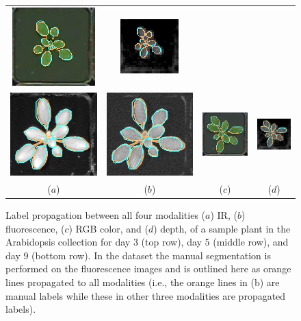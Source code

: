 \begin{figure}[t]
\begin{centering}
\begin{tabular}{cccc}
\includegraphics[width=.15\textwidth]{Figures/LabelAlignment/day_5_hour_23-seg_rgb.png}&
\includegraphics[width=.15\textwidth]{Figures/LabelAlignment/day_5_hour_23-seg_depth.png}\\
\includegraphics[width=.15\textwidth]{Figures/LabelAlignment/day_9_hour_20-seg_ir.png}&
\includegraphics[width=.15\textwidth]{Figures/LabelAlignment/day_9_hour_20-seg_fmp.png}&
\includegraphics[width=.15\textwidth]{Figures/LabelAlignment/day_9_hour_20-seg_rgb.png}&
\includegraphics[width=.15\textwidth]{Figures/LabelAlignment/day_9_hour_20-seg_depth.png}\\
($a$) & ($b$) & ($c$) & ($d$) \\
\end{tabular}
\caption{Label propagation between all four modalities ($a$) IR, ($b$) fluorescence, ($c$) RGB color, and ($d$) depth, of a sample plant in the Arabidopsis collection for day $3$ (top row), day $5$ (middle row), and day $9$ (bottom row).
In the dataset the manual segmentation is performed on the fluorescence images and is outlined here as orange lines propagated to all modalities (i.e., the orange lines in (b) are manual labels while these in other three modalities are propagated labels).
}
\end{centering}
\end{figure}
